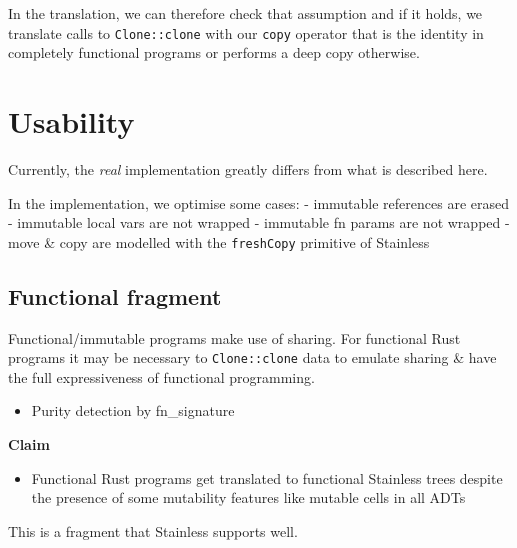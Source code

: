 In the translation, we can therefore check that assumption and if it
holds, we translate calls to \passthrough{\lstinline!Clone::clone!} with
our \passthrough{\lstinline!copy!} operator that is the identity in
completely functional programs or performs a deep copy otherwise.

\clearpage
{}
\section{Usability}

Currently, the \emph{real} implementation greatly differs from what is
described here.

In the implementation, we optimise some cases: - immutable references
are erased - immutable local vars are not wrapped - immutable fn params
are not wrapped - move \& copy are modelled with the
\passthrough{\lstinline!freshCopy!} primitive of Stainless

\subsection{Functional fragment}

Functional/immutable programs make use of sharing. For functional Rust
programs it may be necessary to \passthrough{\lstinline!Clone::clone!}
data to emulate sharing \& have the full expressiveness of functional
programming.

\begin{itemize}
\tightlist
\item
  Purity detection by fn\_signature
\end{itemize}

\textbf{Claim}

\begin{itemize}
\tightlist
\item
  Functional Rust programs get translated to functional Stainless trees
  despite the presence of some mutability features like mutable cells in
  all ADTs
\end{itemize}

This is a fragment that Stainless supports well.
